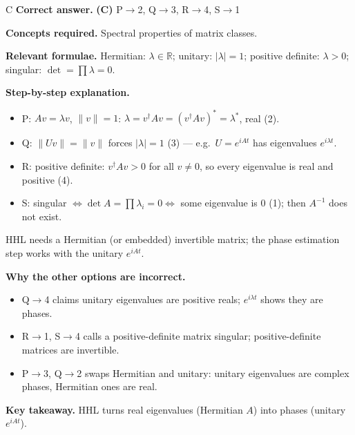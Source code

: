 \documentclass[11pt,a4paper]{article}
\newcommand{\qsep}{\par\vspace{2pt}{\color{black!15}\hrule}\vspace{4pt}}
\begin{document}
\begin{solbox}{C}
\textbf{\color{brand}Correct answer.} \textcolor{okgreen}{\textbf{(C)}} P$\to$2, Q$\to$3, R$\to$4, S$\to$1

\textbf{\color{brand}Concepts required.} Spectral properties of matrix classes.

\textbf{\color{brand}Relevant formulae.} Hermitian: $\lambda\in\mathbb R$; unitary: $|\lambda| = 1$; positive definite: $\lambda > 0$; singular: $\det = \prod\lambda = 0$.

\textbf{\color{brand}Step-by-step explanation.} \begin{itemize}\itemsep0pt
\item P: $Av = \lambda v$, $\|v\| = 1$: $\lambda = v^\dagger Av = (v^\dagger Av)^* = \lambda^*$, real (2).
\item Q: $\|Uv\| = \|v\|$ forces $|\lambda| = 1$ (3) --- e.g.\ $U = e^{iAt}$ has eigenvalues $e^{i\lambda t}$.
\item R: positive definite: $v^\dagger Av > 0$ for all $v \ne 0$, so every eigenvalue is real and positive (4).
\item S: singular $\iff \det A = \prod\lambda_i = 0 \iff$ some eigenvalue is $0$ (1); then $A^{-1}$ does not exist.
\end{itemize}
HHL needs a Hermitian (or embedded) invertible matrix; the phase estimation step works with the unitary $e^{iAt}$.

\textbf{\color{brand}Why the other options are incorrect.}
\begin{itemize}[leftmargin=2.4em, itemsep=1pt, topsep=2pt]
\item[\textbf{(A)}] Q$\to$4 claims unitary eigenvalues are positive reals; $e^{i\lambda t}$ shows they are phases.
\item[\textbf{(B)}] R$\to$1, S$\to$4 calls a positive-definite matrix singular; positive-definite matrices are invertible.
\item[\textbf{(D)}] P$\to$3, Q$\to$2 swaps Hermitian and unitary: unitary eigenvalues are complex phases, Hermitian ones are real.
\end{itemize}
\textbf{\color{brand}Key takeaway.} HHL turns real eigenvalues (Hermitian $A$) into phases (unitary $e^{iAt}$).
\end{solbox}
\qsep
\end{document}
